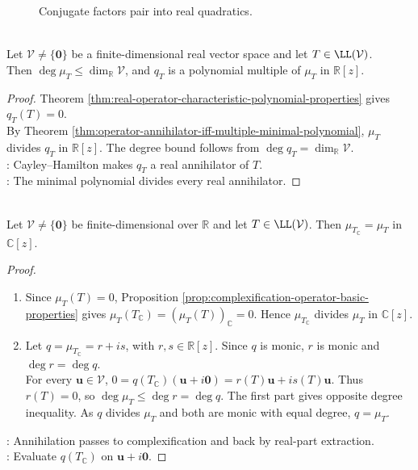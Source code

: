 \begin{figure}[H]
  \centering
  
  \caption{Conjugate factors pair into real quadratics.}
  \label{fig:real-characteristic-conjugate-pairs}
\end{figure}

\begin{corollary} \label{cor:real-characteristic-polynomial-multiple-minimal-polynomial} \\
Let $\mathcal{V}\neq\{\mathbf{0}\}$ be a finite-dimensional real vector space and let $T\in\LL(\mathcal{V})$.\\
Then $\deg\mu_T\leq\dim_{\mathbb{R}}\mathcal{V}$, and $q_T$ is a polynomial multiple of $\mu_T$ in $\mathbb{R}[z]$.
\begin{proof}
Theorem \ref{thm:real-operator-characteristic-polynomial-properties} gives $q_T(T)=0$.\\
By Theorem \ref{thm:operator-annihilator-iff-multiple-minimal-polynomial}, $\mu_T$ divides $q_T$ in $\mathbb{R}[z]$. The degree bound follows from $\deg q_T=\dim_{\mathbb{R}}\mathcal{V}$.\\
: Cayley--Hamilton makes $q_T$ a real annihilator of $T$.\\
: The minimal polynomial divides every real annihilator.
\end{proof}
\end{corollary}

\begin{proposition} \label{prop:minimal-polynomial-complexification} \\
Let $\mathcal{V}\neq\{\mathbf{0}\}$ be finite-dimensional over $\mathbb{R}$ and let $T\in\LL(\mathcal{V})$. Then $\mu_{T_{\mathbb{C}}}=\mu_T$ in $\mathbb{C}[z]$.
\begin{proof}
\begin{enumerate}[label=\roman*.]
\setlength{\itemsep}{0pt}
\item[$(\Rightarrow)$] Since $\mu_T(T)=0$, Proposition \ref{prop:complexification-operator-basic-properties} gives $\mu_T(T_{\mathbb{C}})=(\mu_T(T))_{\mathbb{C}}=0$. Hence $\mu_{T_{\mathbb{C}}}$ divides $\mu_T$ in $\mathbb{C}[z]$.
\item[$(\Leftarrow)$] Let $q=\mu_{T_{\mathbb{C}}}=r+is$, with $r,s\in\mathbb{R}[z]$. Since $q$ is monic, $r$ is monic and $\deg r=\deg q$.\\
For every $\mathbf{u}\in\mathcal{V}$, $0=q(T_{\mathbb{C}})(\mathbf{u}+i\mathbf{0})=r(T)\mathbf{u}+is(T)\mathbf{u}$. Thus $r(T)=0$, so $\deg\mu_T\leq\deg r=\deg q$. The first part gives opposite degree inequality. As $q$ divides $\mu_T$ and both are monic with equal degree, $q=\mu_T$.
\end{enumerate}
: Annihilation passes to complexification and back by real-part extraction.\\
: Evaluate $q(T_{\mathbb{C}})$ on $\mathbf{u}+i\mathbf{0}$.
\end{proof}
\end{proposition}

